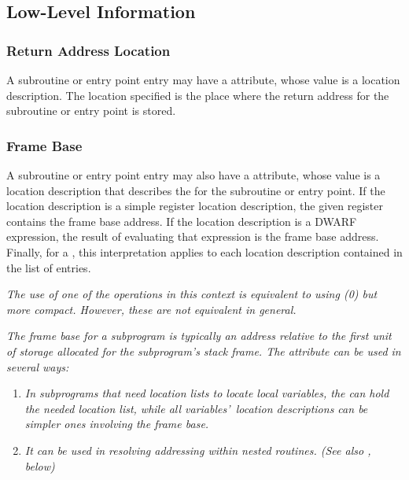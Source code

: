 \subsection{Low-Level Information}
\label{chap:lowlevelinformation}

\bbeb
\subsubsection{Return Address Location}
\label{chap:returnaddresslocation}
A\hypertarget{chap:DWATreturnaddrsubroutinereturnaddresssavelocation}{}
subroutine or entry point entry may have a
\DWATreturnaddrDEFN{}
attribute, whose value is a location description. The location
specified is the place where the return address for the
subroutine or entry point is stored.

\bbeb
\subsubsection{Frame Base}
\label{chap:framebase}
A\hypertarget{chap:DWATframebasesubroutineframebaseaddress}{}
subroutine or entry point entry may also have a
\DWATframebaseDEFN{} attribute, whose value is a location
description that describes the  for the
subroutine or entry point. If the location description is
a simple register location description, the given register
contains the frame base address. If the location description is
a DWARF expression, the result of evaluating that expression
is the frame base address. Finally, for a
,
this interpretation applies to each location description
contained in the list of  entries.

\textit{The use of one of the \DWOPregn{}
operations in this context is equivalent to using
\DWOPbregn(0) but more
compact. However, these are not equivalent in general.}

\textit{The frame base for a subprogram is typically an address
relative to the first unit of storage allocated for the
subprogram\textquoteright s stack frame. The \DWATframebase{} attribute
can be used in several ways:}
\begin{enumerate}[1. ]
\item \textit{In subprograms that need
location lists to locate local
variables, the \DWATframebase{} can hold the needed location
list, while all variables\textquoteright\  location descriptions can be
simpler ones involving the frame base.}

\item \textit{It can be used in resolving  addressing
within nested routines.
(See also \DWATstaticlink, below)}
\end{enumerate}

